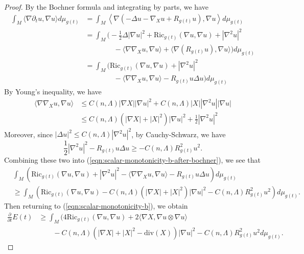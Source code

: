 \documentclass[12pt]{amsart}
\newcommand{\del}{\nabla}
\theoremstyle{remark}
\numberwithin{equation}{section}
\begin{document}
\begin{proof}
    By the Bochner formula and integrating by parts, we have
    \begin{align}\label{eqn:scalar-monotonicity-b-after-bochner}
        \int_M \langle\del\partial_t u,\del u\rangle d\mu_{g(t)} &= \int_M \left\langle\del\left(-\Delta u - \del_Xu + R_{g(t)}u\right),\del u\right\rangle d\mu_{g(t)} \nonumber \\
        &= \int_M \Big(-\frac{1}{2}\Delta|\del u|^2 + \text{Ric}_{g(t)}(\del u,\del u) + |\del^2 u|^2 \nonumber \\
        &\qquad\qquad - \langle\del\del_X u, \del u\rangle + \langle\del(R_{g(t)} u),\del u\rangle\Big)d\mu_{g(t)} \nonumber \\
        &= \int_M \Big(\text{Ric}_{g(t)}(\del u,\del u) + |\del^2 u|^2 \nonumber \\
        &\qquad\qquad - \langle\del\del_X u, \del u\rangle -R_{g(t)}u\Delta u\Big)d\mu_{g(t)}
    \end{align}
    By Young's inequality, we have
    \begin{align*}
        \langle\del\del_X u, \del u\rangle &\leq C(n,\Lambda)|\del X||\del u|^2 + C(n,\Lambda) |X||\del^2 u||\del u| \nonumber \\
        &\leq C(n,\Lambda)(|\del X| + |X|^2)|\del u|^2 + \frac{1}{2}|\del^2u|^2
    \end{align*}
    Moreover, since $|\Delta u|^2 \leq C(n,\Lambda)|\del^2 u|^2$, by Cauchy-Schwarz, we have
    \begin{equation*}
        \frac{1}{2}|\del^2 u|^2 - R_{g(t)}u\Delta u \geq -C(n,\Lambda)R_{g(t)}^2u^2.
    \end{equation*}
    Combining these two into (\ref{eqn:scalar-monotonicity-b-after-bochner}), we see that
    \begin{align*}
        &\int_M \left(\text{Ric}_{g(t)}(\del u, \del u) + |\del^2 u|^2 - \langle\del\del_X u, \del u\rangle -R_{g(t)}u\Delta u\right)d\mu_{g(t)} \nonumber \\
        &\geq \int_M \left(\text{Ric}_{g(t)}(\del u, \del u) - C(n,\Lambda)(|\del X| + |X|^2)|\del u|^2 -C(n,\Lambda)R_{g(t)}^2u^2\right)d\mu_{g(t)}.
    \end{align*}
    Then returning to (\ref{eqn:scalar-monotonicity-b}), we obtain
    \begin{align*}
        \frac{\partial}{\partial t}E(t) &\geq \int_M \Big(4\text{Ric}_{g(t)}(\del u,\del u) + 2\langle\del X,\del u\otimes\del u\rangle \nonumber \\
        &\qquad -C(n,\Lambda)(|\del X| + |X|^2 - \text{div}(X))|\del u|^2 - C(n,\Lambda)R_{g(t)}^2 u^2d\mu_{g(t)}.

\end{align*}
\end{proof}
\end{document}
